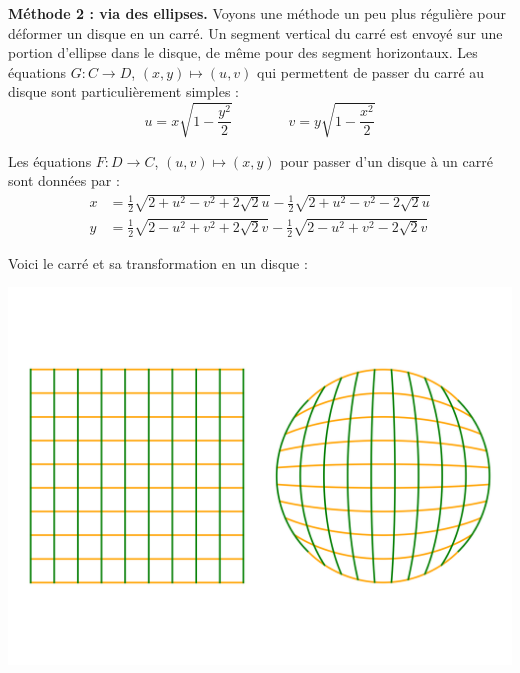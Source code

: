 \documentclass[11pt,class=report,crop=false]{standalone}
\begin{document}
\medskip

\textbf{Méthode 2 : via des ellipses.}
Voyons une méthode un peu plus régulière pour déformer un disque en un carré. 
Un segment vertical du carré est envoyé sur une portion d'ellipse dans le disque, de même pour des segment horizontaux.
Les équations $G : C \to D$, $(x,y) \mapsto (u,v)$ qui permettent de passer du carré au disque sont particulièrement simples :
$$u = x \sqrt{1-\frac{y^2}{2}}
\qquad\qquad
v = y \sqrt{1-\frac{x^2}{2}}
$$

Les équations $F : D \to C$, $(u,v) \mapsto (x,y)$ pour passer d'un disque à un carré sont données par :
\begin{align*}
x &= 
	\frac12 \sqrt{2 + u^2 - v^2 +2 \sqrt{2}u}
	- \frac12 \sqrt{2 + u^2 - v^2 - 2\sqrt{2}u} \\
y &= \frac12 \sqrt{2 - u^2 + v^2 + 2 \sqrt{2}v}
- \frac12 \sqrt{2 - u^2 + v^2 - 2\sqrt{2}v}
\end{align*}


Voici le carré et sa transformation en un disque : 
\begin{center}
	\includegraphics[scale=\myscale,scale=0.5,trim={0 2cm 0 2cm},clip]{figures/carre-cercle-03}
\end{center}
\end{document}
